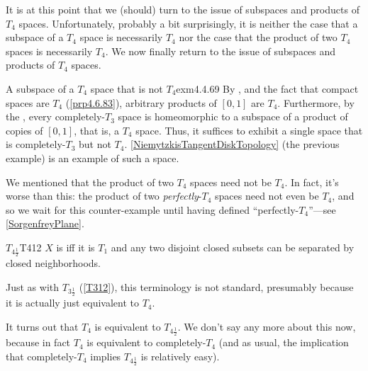 It is at this point that we (should) turn to the issue of subspaces and products of $T_4$ spaces.  Unfortunately, probably a bit surprisingly, it is neither the case that a subspace of a $T_4$ space is necessarily $T_4$ nor the case that the product of two $T_4$ spaces is necessarily $T_4$.
We now finally return to the issue of subspaces and products of $T_4$ spaces.
\begin{exm}{A subspace of a $T_4$ space that is not $T_4$}{exm4.4.69}
By , and the fact that compact spaces are $T_4$ (\cref{prp4.6.83}), arbitrary products of $[0,1]$ are $T_4$.  Furthermore, by the , every completely-$T_3$ space is homeomorphic to a subspace of a product of copies of $[0,1]$, that is, a $T_4$ space.  Thus, it suffices to exhibit a single space that is completely-$T_3$ but not $T_4$.  \cref{NiemytzkisTangentDiskTopology} (the previous example) is an example of such a space.
\end{exm}
We mentioned that the product of two $T_4$ spaces need not be $T_4$.  In fact, it's worse than this:  the product of two \emph{perfectly}-$T_4$ spaces need not even be $T_4$, and so we wait for this counter-example until having defined ``perfectly-$T_4$''---see \cref{SorgenfreyPlane}.

\begin{dfn}{$T_{4\frac{1}{2}}$}{T412}
$X$ is  iff it is $T_1$ and any two disjoint closed subsets can be separated by closed neighborhoods.
\begin{rmk}
Just as with $T_{3\frac{1}{2}}$ (\cref{T312}), this terminology is not standard, presumably because it is actually just equivalent to $T_4$.
\end{rmk}
\begin{rmk}
It turns out that $T_4$ is equivalent to $T_{4\frac{1}{2}}$.  We don't say any more about this now, because in fact $T_4$ is equivalent to completely-$T_4$ (and as usual, the implication that completely-$T_4$ implies $T_{4\frac{1}{2}}$ is relatively easy).
\end{rmk}
\end{dfn}

